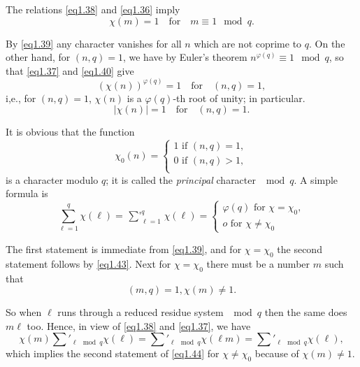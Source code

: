 The relations \eqref{eq1.38} and \eqref{eq1.36} imply 
\begin{equation*}%
\chi (m)=1 \quad \text{for}\quad m \equiv 1\mod q.
\tag{1.40}\label{eq1.40} 
 \end{equation*} 
 
By \eqref{eq1.39} any character vanishes for all $n$ which are not
coprime to $q$. On the other hand, for $(n,q)=1$, we have by Euler's
theorem $n^{\varphi (q)}\equiv 1 \mod q$, so that \eqref{eq1.37} and
\eqref{eq1.40} give  
 \begin{equation*}%
(\chi (n))^{\varphi(q)} = 1\quad \text{for}\quad
   (n,q)=1,\tag{1.41}\label{eq1.41} 
 \end{equation*} 
i,e., for  $(n, q) = 1$, $\chi(n)$ is a $\varphi(q)$-th root of unity;
in particular.  
\begin{equation*}%
|\chi (n)|=1\quad \text{for}\quad (n,q)=1. \tag{1.42}\label{eq1.42}
 \end{equation*}\pageoriginale 
 
It is  obvious that the function  
\begin{equation*}%
\chi_0(n)=  
\begin{cases}
1 \text{  if } (n,q)=1, \\ 
0 \text{  if  } (n,q)>1, \\ 
\end{cases}\tag{1.43}\label{eq1.43}
\end{equation*}
is a character modulo $q$; it is called the \textit{principal}
character $\mod q$. A simple formula is  
\begin{equation*}%
\sum^q_{\ell=1}\chi(\ell) = \mathop{\sum{}'}^q_{\ell=1} \chi(\ell)= 
\begin{cases}
 \varphi (q)  \text{   for } \chi=\chi_0, \\
o \text{   for   }\chi\neq \chi_0
\end{cases}\tag{1.44}\label{eq1.44}
\end{equation*}

The first statement is immediate from \eqref{eq1.39}, and for
$\chi=\chi_0$ the second statement follows by \eqref{eq1.43}. Next for
$\chi=\chi_0$ there must be a number $m$ such that  
\begin{equation*}%
(m,q)=1, \chi(m)\neq 1.\tag{1.45}\label{eq1.45}
\end{equation*}

So when $\ell$ runs through a reduced residue system $\mod q$ then the
same does $m \ell$ too. Hence, in view of \eqref{eq1.38} and
\eqref{eq1.37}, we have  
\begin{equation*}%
\chi(m) \sum'_{\ell \mod q} \chi(\ell) = \sum'_{\ell \mod q} \chi(\ell
m)= \sum'_{\ell \mod q} \chi(\ell),\tag{1.46}\label{eq1.46} 
\end{equation*}
which implies the second statement of \eqref{eq1.44} for $\chi\neq \chi_0$
because of $\chi(m) \neq 1$.  

